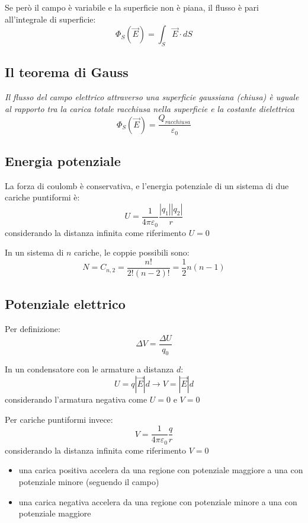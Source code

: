 \documentclass[12pt]{article}
\begin{document}
Se però il campo è variabile e la superficie non è piana, il flusso è pari all'integrale di superficie:
$$ \Phi_S(\vec{E}) = \int_S \vec{E} \cdot dS $$

\subsection{Il teorema di Gauss}
\textit{Il flusso del campo elettrico attraverso una superficie gaussiana (chiusa) è uguale al rapporto tra la carica totale racchiusa nella superficie e la costante dielettrica}
$$ \Phi_S(\vec{E}) = \frac{Q_{racchiusa}}{\varepsilon_0} $$

\subsection{Energia potenziale}
La forza di coulomb è conservativa, e l'energia potenziale di un sistema di due cariche puntiformi è:
$$ U = \frac{1}{4\pi\varepsilon_0}\frac{|q_1||q_2|}{r} $$
considerando la distanza infinita come riferimento $U=0$

\vspace{1em}

In un sistema di $n$ cariche, le coppie possibili sono:
$$ N = C_{n,2} = \frac{n!}{2!(n-2)!} = \frac{1}{2}n(n-1) $$

\subsection{Potenziale elettrico}
Per definizione:
$$ \Delta V = \frac{\Delta U}{q_0} $$

In un condensatore con le armature a distanza $d$:
$$ U = q|\vec{E}|d \longrightarrow V = |\vec{E}|d $$
considerando l'armatura negativa come $U=0$ e $V=0$

\vspace{1em}

Per cariche puntiformi invece:
$$ V = \frac{1}{4\pi\varepsilon_0}\frac{q}{r} $$
considerando la distanza infinita come riferimento $V=0$

\vspace{1em}

\begin{itemize}
    \item una carica positiva accelera da una regione con potenziale maggiore a una con potenziale minore (seguendo il campo)
    \item una carica negativa accelera da una regione con potenziale minore a una con potenziale maggiore
\end{itemize}
\end{document}
